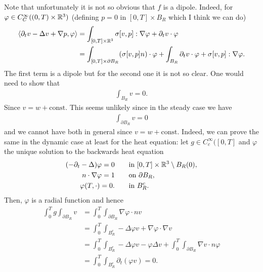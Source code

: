 \documentclass[abstracton, paper=a4, fontsize=11pt,DIV=12,bibliography=totoc]{scrartcl}
\begin{document}
{Note that unfortunately it is not so obvious that $f$ is a dipole.  Indeed, for $\varphi \in C_C^\infty((0,T)\times \mathbb{R}^3)$ (defining $ p = 0$ in $[0,T] \times B_R$ which I think we can do)
\begin{align*}
    \langle \partial_t v  -  \Delta v + \nabla p , \varphi \rangle  &= \int_{[0,T] \times \mathbb{R}^3} \sigma[v,p] : \nabla \varphi + \partial_t v \cdot \varphi \\
    &= \int_{[0,T] \times \partial B_R} (\sigma[v,p]  n) \cdot  \varphi + \int_{B_R} \partial_t v \cdot  \varphi + \sigma[v,p] : \nabla \varphi .
\end{align*}
The first term is a dipole but for the second one it is not so clear. One would need to show that
\begin{align} \label{v_R=0}
    \int_{B_R} v = 0.
\end{align}
Since $v = w + \mathrm{const}$.
This seems unlikely since in the steady case we have
\begin{align*}
    \int_{\partial B_R} v = 0
\end{align*}
and we cannot have both in general since $v = w + \mathrm{const}$.
Indeed, we can prove the same in the dynamic case at least for the heat equation: let $g \in C_c^\infty([0,T]$ and $\varphi$ the unique  solution to the backwards heat equation
\begin{align*}
    (-\partial_t - \Delta) \varphi = 0   & \qquad  \text{in } [0,
    T] \times  \mathbb{R}^3 \setminus B_R(0), \\
    n \cdot \nabla \varphi  = 1 &\qquad \text{on } \partial B_R,\\
  \varphi(T,\cdot) = 0. & \qquad \text{in } B_R^c.
\end{align*}
Then, $\varphi$ is a radial function and hence 
\begin{align*}
    \int_0^T  g \int_{\partial B_R}  v  &= \int_0^T  \int_{\partial B_R} \nabla \varphi \cdot n v\\
    &= \int_0^T  \int_{B_R^c} -\Delta \varphi  v + \nabla \varphi \cdot \nabla v \\
    &=  \int_0^T  \int_{B_R^c} -\Delta \varphi  v  - \varphi \Delta v  + \int_0^T \int_{\partial B_R} \nabla v \cdot n \varphi\\
    & = \int_0^T  \int_{B_R^c} \partial_t (\varphi  v) = 0.
\end{align*}
}
\end{document}

